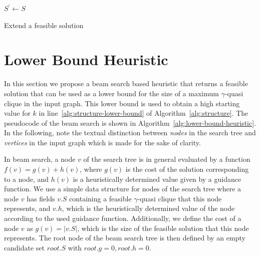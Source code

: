 \documentclass[draft,final]{vutinfth} %
\begin{document}
\begin{algorithm}
    \DontPrintSemicolon
    $S^\prime \gets S$ \;
    \caption{Extend a feasible solution}
    \label{alg:extend}
\end{algorithm}

\section{Lower Bound Heuristic}\label{sec:lower-bound-heuristic}

In this section we propose a beam search based heuristic that returns a feasible solution that can be used as a lower bound for the size of a maximum $\gamma$-quasi clique in the input graph. This lower bound is used to obtain a high starting value for $k$ in line~\ref{alg:structure-lower-bound} of Algorithm~\ref{alg:structure}. 
The pseudocode of the beam search is shown in Algorithm~\ref{alg:lower-bound-heuristic}. 
In the following, note the textual distinction between \emph{nodes} in the search tree and \emph{vertices} in the input graph which is made for the sake of clarity. 

In beam search, a node $v$ of the search tree is in general evaluated by a function $f(v) = g(v) + h(v)$, where $g(v)$ is the cost of the solution corresponding to a node, and $h(v)$ is a heuristically determined value given by a guidance function. 
We use a simple data structure for nodes of the search tree where a node $v$ has fields $\mathit{v.S}$ containing a feasible $\gamma$-quasi clique that this node represents, and $\mathit{v.h}$, which is the heuristically determined value of the node according to the used guidance function.
Additionally, we define the cost of a node $v$ as $g(v) = |v.S|$, which is the size of the feasible solution that this node represents.  
The root node of the beam search tree is then defined by an empty candidate set $\mathit{root.S}$ with $\mathit{root.g}=0, \mathit{root.h}=0$. 
\end{document}

